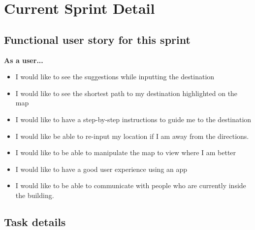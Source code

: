 \documentclass[12pt]{article}
\begin{document}
\section{Current Sprint Detail}

\subsection{Functional user story for this sprint}


\textbf{As a user...}
\begin{itemize}

\item I would like to see the suggestions while inputting the destination
\item I would like to see the shortest path to my destination highlighted on the map
\item I would like to have a step-by-step instructions to guide me to the destination
\item I would like be able to re-input my location if I am away from the directions.
\item I would like to be able to manipulate the map to view where I am better
\item I would like to have a good user experience using an app
\item I would like to be able to communicate with people who are currently inside the building.

\end{itemize}


\subsection{Task details}

%
%



\end{document}

